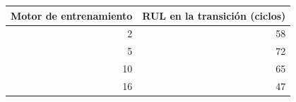 \begin{tabular}{rr}
\toprule
\textbf{Motor de entrenamiento} & \textbf{RUL en la transición (ciclos)} \\
\midrule
2 & 58 \\
5 & 72 \\
10 & 65 \\
16 & 47 \\
\bottomrule
\end{tabular}
